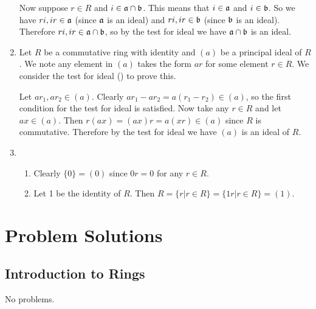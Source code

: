 \begin{enumerate}
    Now suppose $r \in R$ and $i \in \mathfrak{a}\cap\mathfrak{b}$. This means that $i \in \mathfrak{a}$ and $i \in \mathfrak{b}$. So we have $ri, ir \in \mathfrak{a}$ (since $\mathfrak{a}$ is an ideal) and $ri, ir \in \mathfrak{b}$ (since $\mathfrak{b}$ is an ideal). Therefore $ri,ir \in \mathfrak{a}\cap\mathfrak{b}$, so by the test for ideal we have $\mathfrak{a}\cap\mathfrak{b}$ is an ideal.

    \item Let $R$ be a commutative ring with identity and $(a)$ be a principal ideal of $R$. We note any element in $(a)$ takes the form $ar$ for some element $r \in R$. We consider the test for ideal () to prove this.
    
    Let $ar_1, ar_2 \in (a)$. Clearly $ar_1 - ar_2 = a(r_1-r_2) \in (a)$, so the first condition for the test for ideal is satisfied. Now take any $r \in R$ and let $ax \in (a)$. Then $r(ax) = (ax)r = a(xr) \in (a)$ since $R$ is commutative. Therefore by the test for ideal we have $(a)$ is an ideal of $R$.

    \item \begin{enumerate}[label=(\alph*)]
        \item Clearly $\{0\} = (0)$ since $0r = 0$ for any $r \in R$.
        \item Let 1 be the identity of $R$. Then $R = \{r \vert r \in R\} = \{1r \vert r \in R\} = (1)$.
    \end{enumerate}
\end{enumerate}

\chapter{Problem Solutions}
\section{Introduction to Rings}
No problems.

